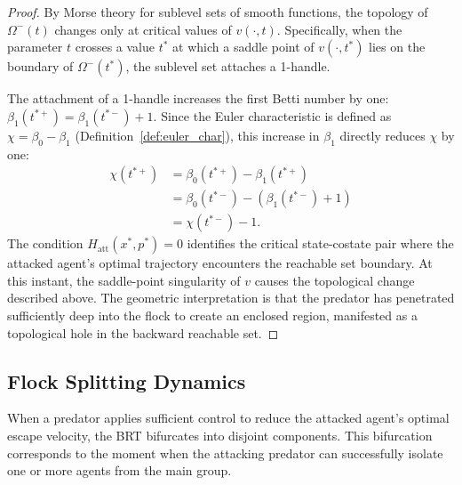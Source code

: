 \begin{proof}
\label{proof:vacuole_nucleation}
By Morse theory for sublevel sets of smooth functions, the topology of $\Omega^{-}(t)$
changes only at critical values of $v(\cdot, t)$.  Specifically, when the parameter
$t$ crosses a value $t^*$ at which a saddle point of $v(\cdot, t^*)$ lies on the
boundary of $\Omega^{-}(t^*)$, the sublevel set attaches a 1-handle.

The attachment of a 1-handle increases the first Betti number by one: $\beta_1(t^{*+}) = \beta_1(t^{*-}) + 1$.
Since the Euler characteristic is defined as $\chi = \beta_0 - \beta_1$ (Definition~\ref{def:euler_char}),
this increase in $\beta_1$ directly reduces $\chi$ by one:
%
\begin{align*}
\chi(t^{*+}) &= \beta_0(t^{*+}) - \beta_1(t^{*+}) \\
&= \beta_0(t^{*-}) - (\beta_1(t^{*-}) + 1) \\
&= \chi(t^{*-}) - 1.
\end{align*}
%
The condition $H_{\mathrm{att}}(x^*, p^*) = 0$ identifies the critical state-costate pair
where the attacked agent's optimal trajectory encounters the reachable set boundary.
At this instant, the saddle-point singularity of $v$ causes the topological change described above.
The geometric interpretation is that the predator has penetrated sufficiently deep into the flock
to create an enclosed region, manifested as a topological hole in the backward reachable set.
\end{proof}

\subsection{Flock Splitting Dynamics}
\label{sec:d39_splitting}

When a predator applies sufficient control to reduce the attacked agent's
optimal escape velocity, the BRT bifurcates into disjoint components.
This bifurcation corresponds to the moment when the attacking predator can
successfully isolate one or more agents from the main group.

